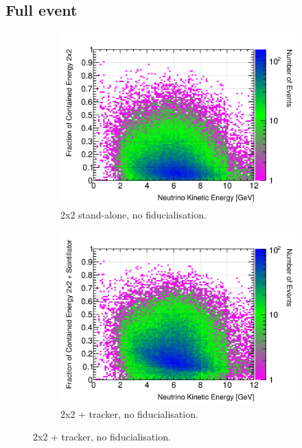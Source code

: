 \documentclass[10pt,a4paper,openany]{article}
\begin{document}
\subsection{Full event}
\begin{figure}[!htb]
	\centering
	\begin{subfigure}[b]{0.49\textwidth}
		\centering
		\includegraphics[width=1.0\textwidth]{E_contained_frac_2x2.png}
		\caption{2x2 stand-alone, no fiducialisation.}
		\label{}
	\end{subfigure}	
	\hfill
	\begin{subfigure}[b]{0.49\textwidth}
		\centering
		\includegraphics[width=1.0\textwidth]{E_contained_frac_2x2_Scintillator_gap.png}
		\caption{2x2 + tracker, no fiducialisation.}
		\label{}
	\end{subfigure}	

\end{figure}
\end{document}
